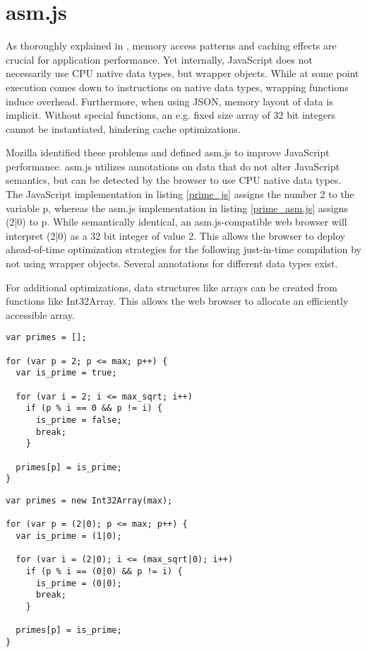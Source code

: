 \section{asm.js} \label{chapter_asm.js}

As thoroughly explained in \cite{memory}, memory access patterns and caching effects are crucial for application performance. Yet internally, JavaScript does not necessarily use CPU native data types, but wrapper objects. While at some point execution comes down to instructions on native data types, wrapping functions induce overhead. Furthermore, when using JSON, memory layout of data is implicit. Without special functions, an e.g. fixed size array of 32 bit integers cannot be instantiated, hindering cache optimizations.

Mozilla identified these problems and defined asm.js to improve JavaScript performance. asm.js utilizes annotations on data that do not alter JavaScript semantics, but can be detected by the browser to use CPU native data types. The JavaScript implementation in listing \ref{prime_js} assigns the number 2 to the variable p, whereas the asm.js implementation in listing \ref{prime_asm.js} assigns (2|0) to p. While semantically identical, an asm.js-compatible web browser will interpret (2|0) as a 32 bit integer of value 2. This allows the browser to deploy ahead-of-time optimization strategies for the following just-in-time compilation by not using wrapper objects. Several annotations for different data types exist. \cite{asm.js_spec}

For additional optimizations, data structures like arrays can be created from functions like Int32Array. This allows the web browser to allocate an efficiently accessible array.

\begin{lstlisting}[frame=single,basicstyle=\footnotesize]
var primes = [];

for (var p = 2; p <= max; p++) {
  var is_prime = true;
  
  for (var i = 2; i <= max_sqrt; i++)
    if (p % i == 0 && p != i) {
      is_prime = false;
      break;
    } 
    
  primes[p] = is_prime;
}
\end{lstlisting}

\begin{lstlisting}[frame=single,basicstyle=\footnotesize]
var primes = new Int32Array(max);

for (var p = (2|0); p <= max; p++) {
  var is_prime = (1|0);  
  
  for (var i = (2|0); i <= (max_sqrt|0); i++)
    if (p % i == (0|0) && p != i) {
      is_prime = (0|0);
      break;
    }
    
  primes[p] = is_prime;
}
\end{lstlisting}



